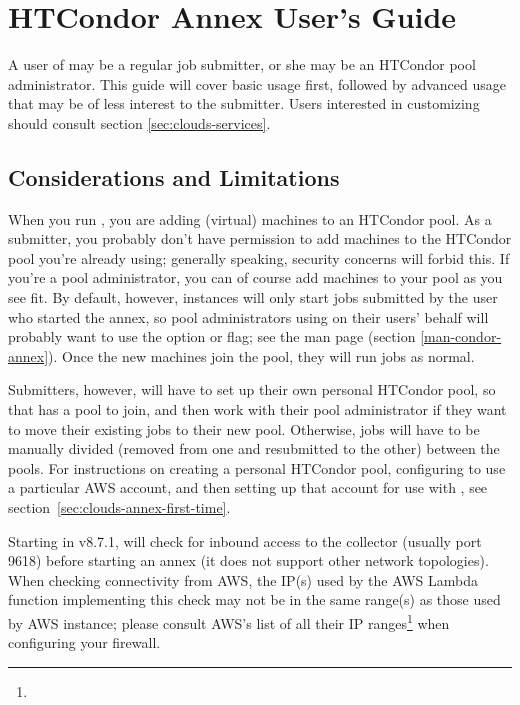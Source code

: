 \section{\label{sec:clouds-annex}HTCondor Annex User's Guide}

A user of  may be a regular job submitter, or she may be an
HTCondor pool administrator.  This guide will cover basic  usage
first, followed by advanced usage that may be of less interest to the
submitter.  Users interested in customizing  should consult
section \ref{sec:clouds-services}.

\subsection{Considerations and Limitations}

When you run , you are adding (virtual) machines to an HTCondor
pool.  As a submitter, you probably don't have permission to add machines to
the HTCondor pool you're already using; generally speaking, security concerns
will forbid this.  If you're a pool administrator, you can of course add
machines to your pool as you see fit.  By default, however, 
instances will only start jobs submitted by the user who started the annex,
so pool administrators using  on their users' behalf will
probably want to use the  option or  flag;
see the man page (section \ref{man-condor-annex}).  Once the new machines
join the pool, they will run jobs as normal.

Submitters, however, will have to set up their own personal HTCondor pool,
so that  has a pool to join, and then work with their pool
administrator if they want to move their existing jobs to their new pool.
Otherwise, jobs will have to be manually divided (removed from one and
resubmitted to the other) between the pools.  For instructions on creating
a personal HTCondor pool, configuring  to use a particular AWS
account, and then setting up that account for use with , see
section~\ref{sec:clouds-annex-first-time}.

Starting in v8.7.1,  will check for inbound access to the
collector (usually port 9618) before starting an annex (it does not
support other network topologies).  When checking connectivity
from AWS, the IP(s) used by the AWS Lambda function implementing this check
may not be in the same range(s) as those used by AWS instance; please
consult AWS's list of all their IP
ranges\footnote{}
when configuring your firewall.

